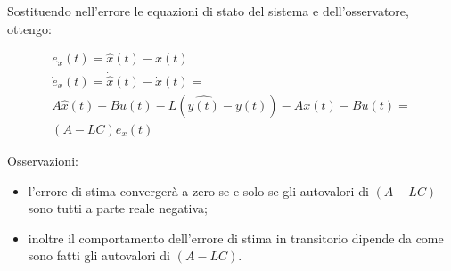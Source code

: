 \begin{tcolorbox}[title= Osservatore dello stato (stimatore assoluto dello stato)]
    Sostituendo nell'errore le equazioni di stato del sistema e dell'osservatore, ottengo:
    \begin{center}
        \begin{align*}
            e_x(t) = \hat{x}(t) - x(t)                                        \\
            \dot{e}_x(t) = \dot{\hat{x}}(t) - \dot{x}(t) =                    \\
            A \hat{x}(t) + B u(t) - L (\hat{y(t)} - y(t)) - A x(t) - B u(t) = \\
            (A - L C) e_x(t)
        \end{align*}
    \end{center}
    Osservazioni:
    \begin{itemize}
        \item l'errore di stima convergerà a zero se e solo se gli autovalori di $(A - L C)$
              sono tutti a parte reale negativa;
        \item inoltre il comportamento dell'errore di stima in transitorio dipende da come
              sono fatti gli autovalori di $(A - L C)$.
    \end{itemize}
\end{tcolorbox}
